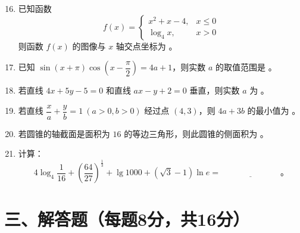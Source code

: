 \documentclass[12pt,a4paper]{ctexart}
\begin{document}
\begin{enumerate}
    \setcounter{enumi}{15}
    \item 已知函数 
    \[
    f(x)=
    \begin{cases}
        x^2 + x - 4, & x \leq 0 \\
        \log_{4}x, & x > 0
    \end{cases}
    \]
    则函数 $f(x)$ 的图像与 $x$ 轴交点坐标为 \underline{\hspace{3cm}}。

    \item 已知 $\sin(x + \pi)\cos(x - \dfrac{\pi}{2}) = 4a + 1$，则实数 $a$ 的取值范围是 \underline{\hspace{3cm}}。

    \item 若直线 $4x + 5y - 5 = 0$ 和直线 $ax - y + 2 = 0$ 垂直，则实数 $a$ 为 \underline{\hspace{3cm}}。

    \item 若直线 $\dfrac{x}{a}+\dfrac{y}{b}=1\ (a > 0,b > 0)$ 经过点 $(4,3)$，则 $4a + 3b$ 的最小值为 \underline{\hspace{3cm}}。

    \item 若圆锥的轴截面是面积为 $16$ 的等边三角形，则此圆锥的侧面积为 \underline{\hspace{3cm}}。

    \item 计算：
    \[
    4\log_{4}\dfrac{1}{16}+\left(\dfrac{64}{27}\right)^{\frac{1}{3}}+\lg1000+(\sqrt{3} - 1)\ln e=
    \underline{\hspace{3cm}}。
    \]
\end{enumerate}

\section*{三、解答题（每题8分，共16分）}
\end{document}
